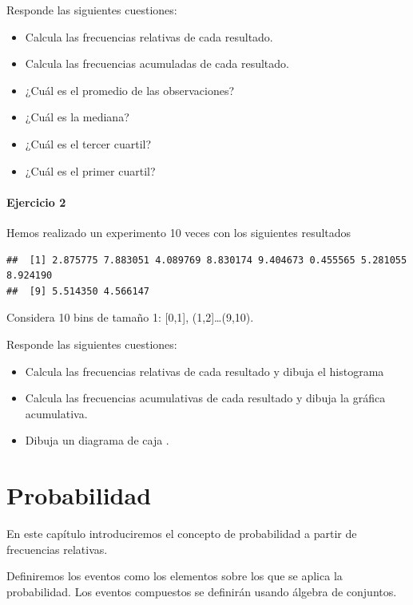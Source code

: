 \documentclass[
]{book}
\providecommand{\tightlist}{%
  \setlength{\itemsep}{0pt}\setlength{\parskip}{0pt}}
\begin{document}
Responde las siguientes cuestiones:

\begin{itemize}
\tightlist
\item
  Calcula las frecuencias relativas de cada resultado.
\item
  Calcula las frecuencias acumuladas de cada resultado.
\item
  ¿Cuál es el promedio de las observaciones?
\item
  ¿Cuál es la mediana?
\item
  ¿Cuál es el tercer cuartil?
\item
  ¿Cuál es el primer cuartil?
\end{itemize}

\hypertarget{ejercicio-2}{%
\subsubsection{Ejercicio 2}\label{ejercicio-2}}

Hemos realizado un experimento 10 veces con los siguientes resultados

\begin{verbatim}
##  [1] 2.875775 7.883051 4.089769 8.830174 9.404673 0.455565 5.281055 8.924190
##  [9] 5.514350 4.566147
\end{verbatim}

Considera 10 bins de tamaño 1: {[}0,1{]}, (1,2{]}\ldots(9,10).

Responde las siguientes cuestiones:

\begin{itemize}
\item
  Calcula las frecuencias relativas de cada resultado y dibuja el histograma
\item
  Calcula las frecuencias acumulativas de cada resultado y dibuja la gráfica acumulativa.
\item
  Dibuja un diagrama de caja .
\end{itemize}

\hypertarget{probabilidad}{%
\chapter{Probabilidad}\label{probabilidad}}

En este capítulo introduciremos el concepto de probabilidad a partir de frecuencias relativas.

Definiremos los eventos como los elementos sobre los que se aplica la probabilidad. Los eventos compuestos se definirán usando álgebra de conjuntos.
\end{document}
